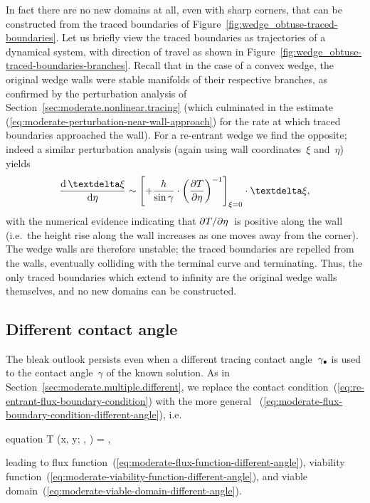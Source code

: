 In fact there are no new domains at all,
even with sharp corners,
that can be constructed from the traced boundaries
of Figure~\ref{fig:wedge_obtuse-traced-boundaries}.
Let us briefly view the traced boundaries
as trajectories of a dynamical system,
with direction of travel as shown in
Figure~\ref{fig:wedge_obtuse-traced-boundaries-branches}.
Recall that in the case of a convex wedge,
the original wedge walls were stable manifolds of their respective branches,
as confirmed by the perturbation analysis
of Section~\ref{sec:moderate.nonlinear.tracing}
(which culminated in the estimate~%
  (\ref{eq:moderate-perturbation-near-wall-approach})
for the rate at which traced boundaries approached the wall).
For a re-entrant wedge we find the opposite;
indeed a similar perturbation analysis
(again using wall coordinates~$\xi$ and~$\eta$)
yields
\begin{equation}
  \tder{\vd\xi}{\eta} \asy
    \squarebr*{
      +\frac{h}{\sin\gamma} \cdot \roundbr*{\pder{T}{\eta}}^{-1}
    }_{\xi=0}
      \cdot \vd\xi,
  \label{eq:re-entrant-perturbation-near-wall-repulsion}
\end{equation}
with the numerical evidence indicating that
$\mathop{}\!\partial T / {\mathop{}\!\partial\eta}$~is positive along the wall
(i.e.~the height rise along the wall increases
as one moves away from the corner).
The wedge walls are therefore unstable;
the traced boundaries are repelled from the walls,
eventually colliding with the terminal curve and terminating.
Thus, the only traced boundaries which extend to infinity
are the original wedge walls themselves,
and no new domains can be constructed.

\subsection{Different contact angle}
\label{sec:re-entrant.rounding.different}

The bleak outlook persists
even when a different tracing contact angle~$\gamma_\bullet$ is used
to the contact angle~$\gamma$ of the known solution.
As in Section~\ref{sec:moderate.multiple.different},
we replace the contact condition~(\ref{eq:re-entrant-flux-boundary-condition})
with the more general~%
  (\ref{eq:moderate-flux-boundary-condition-different-angle}),
i.e.
\begin{important}{equation}
  \normalvec \dotp \del T (x, y; \alpha, \gamma) =
    \cos\tr{\gamma}
    ,
  \label{eq:re-entrant-flux-boundary-condition-different-angle}
\end{important}
leading to flux function~(\ref{eq:moderate-flux-function-different-angle}),
viability function~(\ref{eq:moderate-viability-function-different-angle}),
and viable domain~(\ref{eq:moderate-viable-domain-different-angle}).

